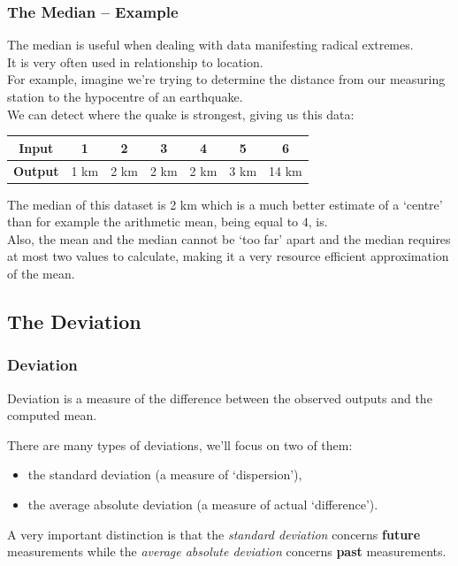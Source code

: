 \documentclass[aspectratio=169,11pt,svgnames,handout]{beamer}
\begin{document}
\begin{frame}
 \frametitle{The Median -- Example}
 The median is useful when dealing with data manifesting radical extremes.\\
 \pause
 It is very often used in relationship to \alert{location}.\\
 \pause
 For example, imagine we're trying to determine the distance from our measuring
 station to the hypocentre of an earthquake.\\
 \pause
 We can detect where the quake is strongest, giving us this data:
 \begin{center}
  \begin{tabular}{c|cccccc}
   \textbf{Input} & 1 & 2 & 3 & 4 & 5 & 6\\
   \midrule
   \textbf{Output} & 1 km & 2 km & 2 km & 2 km & 3 km & 14 km
  \end{tabular}
 \end{center}
 \pause
 The median of this dataset is 2 km which is a much better estimate of a
 `centre' than for example the arithmetic mean, being equal to $4$, is.\\
 \pause
 Also, the mean and the median cannot be `too far' apart and the median requires
 at most two values to calculate, making it a very resource efficient
 approximation of the mean.
\end{frame}

\subsection{The Deviation}
\begin{frame}
 \frametitle{}
 \subsectionpage
\end{frame}

\begin{frame}
 \frametitle{Deviation}
 \begin{tcolorbox}[title=Deviation]
  \alert{Deviation} is a measure of the difference between the observed outputs
  and the computed mean.
 \end{tcolorbox}
 \pause
 There are many types of deviations, we'll focus on two of them:
 \pause
 \begin{itemize}[label=\textbullet]
  \item the \alert{standard deviation} (a measure of `dispersion'),
  \pause
  \item the \alert{average absolute deviation} (a measure of actual
   `difference').
 \end{itemize}
 \pause
 A \alert{very important distinction} is that the \emph{standard deviation}
 concerns \textbf{future} measurements while the \emph{average absolute
 deviation} concerns \textbf{past} measurements.
\end{frame}
\end{document}
